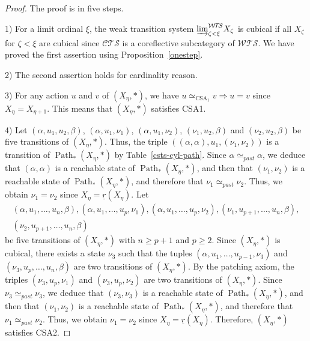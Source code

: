 \documentclass[a4paper,12pt]{amsart}
\begin{document}
\begin{proof} The proof is in five steps. 

1) For a limit ordinal $\xi$, the weak transition system
${\varinjlim}^{\mathcal{W\!T\!S}}_{\zeta<\xi} X_\zeta$ is cubical if all $X_\zeta$ for
$\zeta < \xi$ are cubical since ${\mathcal{C\!T\!S}}$ is a coreflective subcategory
of ${\mathcal{W\!T\!S}}$. We have proved the first assertion using
Proposition~\ref{onestep}.

2) The second assertion holds for cardinality reason. 

3) For any action $u$ and $v$ of $(X_\eta,*)$, we have
$u\simeq_{\operatorname{CSA}_1} v \Rightarrow u=v$ since $X_\eta=X_{\eta+1}$. This
means that $(X_\eta,*)$ satisfies CSA1.

4) Let $(\alpha,u_1,u_2,\beta)$, $(\alpha,u_1,\nu_1)$,
$(\alpha,u_1,\nu_2)$, $(\nu_1,u_2,\beta)$ and $(\nu_2,u_2,\beta)$ be
five transitions of $(X_\eta,*)$.  Thus, the triple
$((\alpha,\alpha),u_1,(\nu_1,\nu_2))$ is a transition of
$\operatorname{{Path}}_*(X_\eta,*)$ by Table~\ref{csts-cyl-path}.  Since
$\alpha\simeq_{past} \alpha$, we deduce that $(\alpha,\alpha)$ is a
reachable state of $\operatorname{{Path}}_*(X_\eta,*)$, and then that $(\nu_1,\nu_2)$
is a reachable state of $\operatorname{{Path}}_*(X_\eta,*)$, and therefore that
$\nu_1\simeq_{past} \nu_2$.  Thus, we obtain $\nu_1=\nu_2$ since
$X_\eta=\underline{r}(X_\eta)$.  Let
\begin{multline*}(\alpha,u_1,\dots,u_n,\beta),(\alpha,u_1,\dots,u_p,\nu_1),
(\alpha,u_1,\dots,u_p,\nu_2),(\nu_1,u_{p+1},\dots,u_n,\beta),\\
(\nu_2,u_{p+1},\dots,u_n,\beta)
\end{multline*} be five transitions of $(X_\eta,*)$ with $n{\geqslant} p+1$
and $p{\geqslant} 2$. Since $(X_\eta,*)$ is cubical, there exists a state
$\nu_3$ such that the tuples $(\alpha,u_1,\dots,u_{p-1},\nu_3)$ and
$(\nu_3,u_p,\dots,u_n,\beta)$ are two transitions of $(X_\eta,*)$.  By
the patching axiom, the triples $(\nu_3,u_p,\nu_1)$ and
$(\nu_3,u_p,\nu_2)$ are two transitions of $(X_\eta,*)$.  Since
$\nu_3\simeq_{past} \nu_3$, we deduce that $(\nu_3,\nu_3)$ is a
reachable state of $\operatorname{{Path}}_*(X_\eta,*)$, and then that $(\nu_1,\nu_2)$
is a reachable state of $\operatorname{{Path}}_*(X_\eta,*)$, and therefore that
$\nu_1\simeq_{past} \nu_2$.  Thus, we obtain $\nu_1=\nu_2$ since
$X_\eta=\underline{r}(X_\eta)$. Therefore, $(X_\eta,*)$ satisfies
CSA2.


\end{proof}
\end{document}
